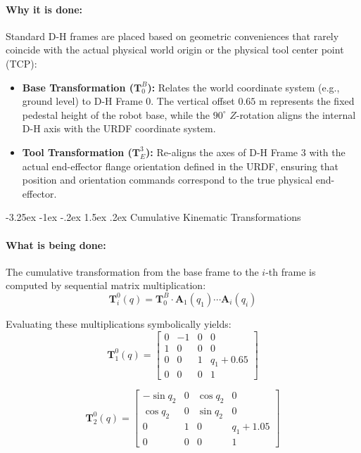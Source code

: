 \documentclass[11pt, a4paper]{article}
\makeatletter
\renewcommand{\subsection}{\@startsection{subsection}{2}{\z@}%
    {-3.25ex \@plus -1ex \@minus -.2ex}%
    {1.5ex \@plus .2ex}%
    {\normalfont\large\bfseries\color{brandaccent}}}
\makeatother
\begin{document}
\paragraph{Why it is done:}
Standard D-H frames are placed based on geometric conveniences that rarely coincide with the actual physical world origin or the physical tool center point (TCP):
\begin{itemize}[leftmargin=1.5em]
    \item \textbf{Base Transformation ($\mathbf{T}_0^B$):} Relates the world coordinate system (e.g., ground level) to D-H Frame $0$. The vertical offset $0.65\text{ m}$ represents the fixed pedestal height of the robot base, while the $90^\circ$ $Z$-rotation aligns the internal D-H axis with the URDF coordinate system.
    \item \textbf{Tool Transformation ($\mathbf{T}_E^3$):} Re-aligns the axes of D-H Frame 3 with the actual end-effector flange orientation defined in the URDF, ensuring that position and orientation commands correspond to the true physical end-effector.
\end{itemize}

\subsection{Cumulative Kinematic Transformations}
\paragraph{What is being done:}
The cumulative transformation from the base frame to the $i$-th frame is computed by sequential matrix multiplication:
\begin{equation}
    \mathbf{T}_i^0(q) = \mathbf{T}_0^B \cdot \mathbf{A}_1(q_1) \cdots \mathbf{A}_i(q_i)
\end{equation}

Evaluating these multiplications symbolically yields:
\begin{equation}
\mathbf{T}_1^0(q) = \begin{bmatrix}
0 & -1 & 0 & 0 \\
1 & 0 & 0 & 0 \\
0 & 0 & 1 & q_1 + 0.65 \\
0 & 0 & 0 & 1
\end{bmatrix}
\end{equation}

\begin{equation}
\mathbf{T}_2^0(q) = \begin{bmatrix}
-\sin q_2 & 0 & \cos q_2 & 0 \\
\cos q_2 & 0 & \sin q_2 & 0 \\
0 & 1 & 0 & q_1 + 1.05 \\
0 & 0 & 0 & 1
\end{bmatrix}
\end{equation}
\end{document}
